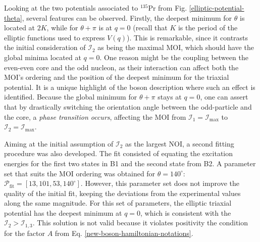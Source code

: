 Looking at the two potentials associated to $^{135}$Pr from Fig. \ref{elliptic-potential-theta}, several features can be observed. Firstly, the deepest minimum for $\theta$ is located at $2K$, while for $\theta+\pi$ is at $q=0$ (recall that $K$ is the period of the elliptic functions used to express $V(q)$). This is remarkable, since it contrasts the initial consideration of $\mathcal{I}_2$ as being the maximal MOI, which should have the global minima located at $q=0$. One reason might be the coupling between the even-even core and the odd nucleon, as their interaction can affect both the MOI's ordering and the position of the deepest minimum for the triaxial potential. It is a unique highlight of the boson description where such an effect is identified. Because the global minimum for $\theta+\pi$ stays at $q=0$, one can assert that by drastically switching the orientation angle between the odd-particle and the core, a \emph{phase transition occurs}, affecting the MOI from $\mathcal{I}_1=\mathcal{I}_\text{max}$ to $\mathcal{I}_2=\mathcal{I}_\text{max}$.

Aiming at the initial assumption of $\mathcal{I}_2$ as the largest NOI, a second fitting procedure was also developed. The fit consisted of equating the excitation energies for the first two states in B1 and the second state from B2. A parameter set that suits the MOI ordering was obtained for $\theta=140^\circ$: $\mathcal{P}_\text{fit}=\left[13,101,53,140^\circ\right]$. However, this parameter set does not improve the quality of the initial fit, keeping the deviations from the experimental values along the same magnitude. For this set of parameters, the elliptic triaxial potential has the deepest minimum at $q=0$, which is consistent with the $\mathcal{I}_2>\mathcal{I}_{1,3}$. This solution is not valid because it violates positivity the condition for the factor $A$ from Eq. \ref{new-boson-hamiltonian-notations}.


